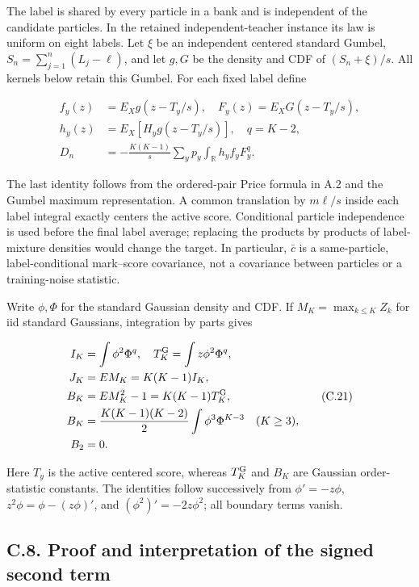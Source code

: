 \documentclass{article}
\begin{document}
The label is shared by every particle in a bank and is independent of
the candidate particles. In the retained independent-teacher instance
its law is uniform on eight labels. Let \(\xi\) be an independent
centered standard Gumbel, \(S_n=\sum_{j=1}^n(L_j-\ell)\), and let
\(g,G\) be the density and CDF of \((S_n+\xi)/s\). All kernels below
retain this Gumbel. For each fixed label define

\[
\begin{aligned}
f_y(z)&=E_Xg(z-T_y/s),\quad F_y(z)=E_XG(z-T_y/s),\\
h_y(z)&=E_X[H_yg(z-T_y/s)],\quad q=K-2,\\
D_n&=-\frac{K(K-1)}s\sum_yp_y\int_{\mathbb R}h_yf_yF_y^q.
\end{aligned}
\tag{C.20}
\]

The last identity follows from the ordered-pair Price formula in A.2 and
the Gumbel maximum representation. A common translation by \(m\ell/s\)
inside each label integral exactly centers the active score. Conditional
particle independence is used before the final label average; replacing
the products by products of label-mixture densities would change the
target. In particular, \(\bar c\) is a same-particle, label-conditional
mark--score covariance, not a covariance between particles or a
training-noise statistic.

Write \(\phi,\Phi\) for the standard Gaussian density and CDF. If
\(M_K=\max_{k\le K}Z_k\) for iid standard Gaussians, integration by
parts gives

\[
\begin{aligned}
I_K&=\int\phi^2\Phi^q,\quad T_K^{\rm G}=\int z\phi^2\Phi^q,\\
J_K&=EM_K=K(K-1)I_K,\\
B_K&=EM_K^2-1=K(K-1)T_K^{\rm G},\\
B_K&=\frac{K(K-1)(K-2)}2\int\phi^3\Phi^{K-3}\quad(K\ge3),\\
B_2&=0.
\end{aligned}
\tag{C.21}
\]

Here \(T_y\) is the active centered score, whereas \(T_K^{\rm G}\) and
\(B_K\) are Gaussian order-statistic constants. The identities follow
successively from \(\phi'=-z\phi\), \(z^2\phi=\phi-(z\phi)'\), and
\((\phi^2)'=-2z\phi^2\); all boundary terms vanish.

\subsection*{C.8. Proof and interpretation of the signed second
term}\label{c.8.-proof-and-interpretation-of-the-signed-second-term}
\end{document}
